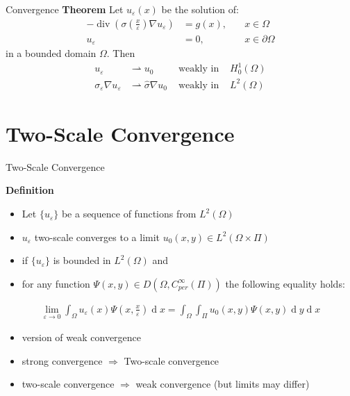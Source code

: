 \documentclass[10pt]{beamer}	%
\begin{document}
\begin{frame}{Convergence}
\textbf{Theorem}
Let 
$u_\varepsilon(x)$ be the solution of:
\begin{align*}
-\operatorname{div} (\sigma(\frac{x}{\varepsilon}) \nabla u_{\varepsilon}) &= g(x) , \quad & x \in \Omega\\
u_{\varepsilon} &= 0, \quad &x \in \partial \Omega
\end{align*}
in a bounded domain $\Omega$. Then 
\begin{align*}
u_{\varepsilon} &\rightharpoonup u_0 &\text{ weakly in } &H^1_0(\Omega)\\
\sigma_{\varepsilon}\nabla u_{\varepsilon} &\rightharpoonup \hat \sigma \nabla u_0 &\text{ weakly in } &L^2(\Omega)
\end{align*}
\end{frame}


%

%
\section{Two-Scale Convergence}
\begin{frame}{Two-Scale Convergence}

\textbf{Definition}
\begin {itemize}
\item Let $\{u_\varepsilon\}$ be a sequence of functions from $L^2(\Omega)$
\item  $u_\varepsilon$ two-scale converges to a limit
$u_0(x,y)\in L^2(\Omega \times \Pi)$
\\
\item if $\{u_\varepsilon\}$ is bounded in $L^2(\Omega)$ and
\item for any function $\Psi(x,y)\in D(\Omega,C^\infty_{per}(\Pi))$ the following equality holds:
\end{itemize}

\begin{align*}
\lim_{\varepsilon \to 0} \int_
{\Omega} u_\varepsilon (x) \Psi(x,\frac{x}{\varepsilon}) \operatorname d x = \int_{\Omega} \int_\Pi u_0(x,y) \Psi(x,y)\operatorname d y \operatorname d x
\end{align*}

\begin{itemize}
\item version of weak convergence
\item strong convergence $\Rightarrow$ Two-scale convergence
\item two-scale convergence $\Rightarrow$ weak convergence (but limits may differ)
\end{itemize}
\end{frame}
\end{document}
